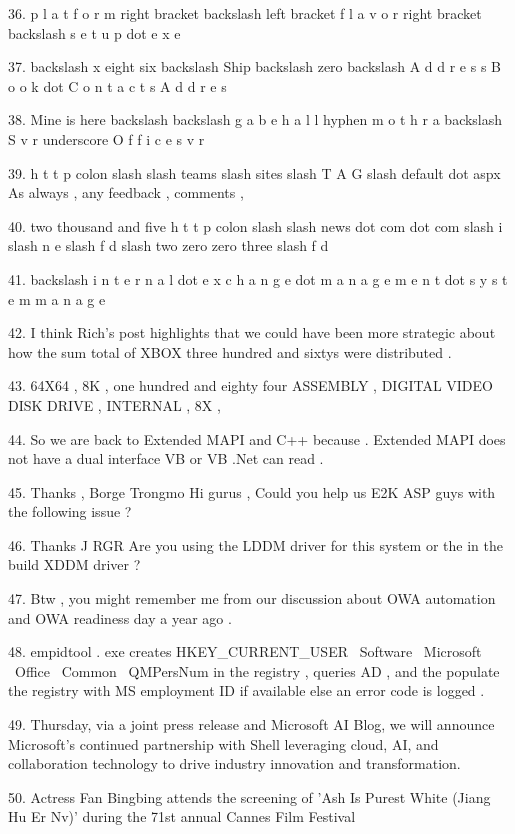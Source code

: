 \documentclass{article}
\begin{document}
{\begin{hangparas}{1.6em}{1}
36. p l a t f o r m right bracket backslash left bracket f l a v o r right bracket backslash s e t u p dot e x e \par
37. backslash x eight six backslash Ship backslash zero backslash A d d r e s s B o o k dot C o n t a c t s A d d r e s \par
38. Mine is here backslash backslash g a b e h a l l hyphen m o t h r a backslash S v r underscore O f f i c e s v r \par
39. h t t p colon slash slash teams slash sites slash T A G slash default dot aspx As always , any feedback , comments , \par
40. two thousand and five h t t p colon slash slash news dot com dot com slash i slash n e slash f d slash two zero zero three slash f d \par
41. backslash i n t e r n a l dot e x c h a n g e dot m a n a g e m e n t dot s y s t e m m a n a g e \par
42. I think Rich's post highlights that we could have been more strategic about how the sum total of XBOX three hundred and sixtys were distributed . \par
43. 64X64 , 8K , one hundred and eighty four ASSEMBLY , DIGITAL VIDEO DISK DRIVE , INTERNAL , 8X , \par
44. So we are back to Extended MAPI and C++ because . Extended MAPI does not have a dual interface VB or VB .Net can read . \par
45. Thanks , Borge Trongmo Hi gurus , Could you help us E2K ASP guys with the following issue ? \par
46. Thanks J RGR Are you using the LDDM driver for this system or the in the build XDDM driver ? \par
47. Btw , you might remember me from our discussion about OWA automation and OWA readiness day a year ago . \par
48. empidtool . exe creates HKEY\_CURRENT\_USER \ Software \ Microsoft \ Office \ Common \ QMPersNum in the registry , queries AD , and the populate the registry with MS employment ID if available else an error code is logged . \par
49. Thursday, via a joint press release and Microsoft AI Blog, we will announce Microsoft's continued partnership with Shell leveraging cloud, AI, and collaboration technology to drive industry innovation and transformation. \par

50. Actress Fan Bingbing attends the screening of 'Ash Is Purest White (Jiang Hu Er Nv)' during the 71st annual Cannes Film Festival \par
\end{hangparas}
}
\end{document}
